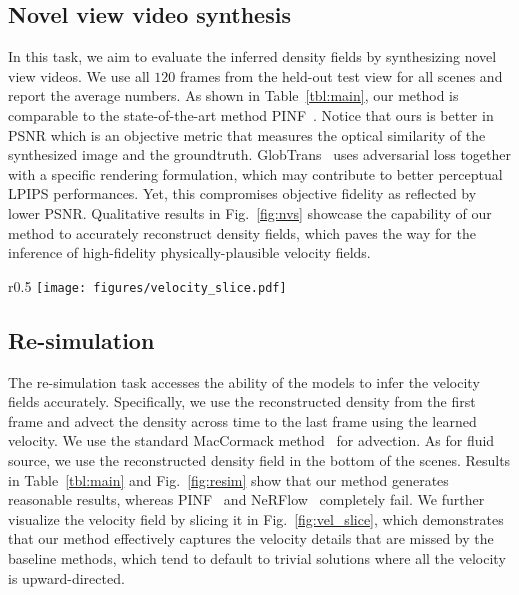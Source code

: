 \documentclass{article}
\newcommand{\fig}[1]{Fig.~\ref{#1}}
\newcommand{\tbl}[1]{Table~\ref{#1}}
\begin{document}
\subsection{Novel view video synthesis} In this task, we aim to evaluate the inferred density fields by synthesizing novel view videos. We use all $120$ frames from the held-out test view for all scenes and report the average numbers. As shown in \tbl{tbl:main}, our method is comparable to the state-of-the-art method PINF~\citep{chu2022physics}. Notice that ours is better in PSNR which is an objective metric that measures the optical similarity of the synthesized image and the groundtruth. GlobTrans~\citep{franz2021global} uses adversarial loss together with a specific rendering formulation, which may contribute to better perceptual LPIPS performances. Yet, this compromises objective fidelity as reflected by lower PSNR. Qualitative results in \fig{fig:nvs} showcase the capability of our method to accurately reconstruct density fields, which paves the way for the inference of high-fidelity physically-plausible velocity fields.


\begin{wrapfigure}{r}{0.5\textwidth}
    \centering
    \vspace{-0.7cm}
    \texttt{[image: figures/velocity\_slice.pdf]}
  \caption{Velocity slice on a real capture.}
  \label{fig:vel_slice}
\end{wrapfigure} 
\subsection{Re-simulation} The re-simulation task accesses the ability of the models to infer the velocity fields accurately. Specifically, we use the reconstructed density from the first frame and advect the density across time to the last frame using the learned velocity. We use the standard MacCormack method~\citep{selle2008unconditionally} for advection. As for fluid source, we use the reconstructed density field in the bottom of the scenes. Results in \tbl{tbl:main} and \fig{fig:resim} show that our method generates reasonable results, whereas PINF~\citep{chu2022physics} and NeRFlow~\citep{du2021neural} completely fail. We further visualize the velocity field by slicing it in \fig{fig:vel_slice}, which demonstrates that our method effectively captures the velocity details that are missed by the baseline methods, which tend to default to trivial solutions where all the velocity is upward-directed.
\end{document}
